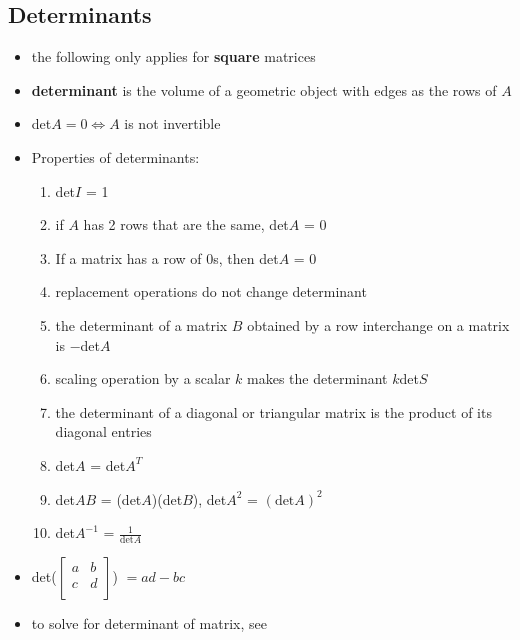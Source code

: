 \documentclass[a4paper,12pt]{article}
\theoremstyle{definition}
\theoremstyle{definition}
\begin{document}
	\subsection{Determinants}
	\begin{itemize}
		\item the following only applies for \textbf{square} matrices
		
		\item \textbf{determinant} is the volume of a geometric object with edges as the rows of $A$
		
		\item det$A = 0 \Leftrightarrow A$ is not invertible
		
		\item Properties of determinants:
		\begin{enumerate}
			\item det$I$ = 1
			\item if $A$ has 2 rows that are the same, det$A$ = 0
			\item If a matrix has a row of 0s, then det$A$ = 0
			\item replacement operations do not change determinant
			\item the determinant of a matrix $B$ obtained by a row interchange on a matrix is $-$det$A$
			\item scaling operation by a scalar $k$ makes the determinant $k$det$S$
			\item the determinant of a diagonal or triangular matrix is the product of its diagonal entries
			\item det$A$ = det$A^T$
			\item det$AB$ = (det$A$)(det$B$), det$A^2$ = $(\text{det}A)^2$
			\item det$A^{-1}$ = $\frac{1}{\text{det}A}$
		\end{enumerate}
		
		\item det($
		\begin{bmatrix}
			a & b\\
			c & d\\
		\end{bmatrix}$) $= ad - bc$
		
		\item to solve for determinant of matrix, see 
	\end{itemize}
	
\end{document}
